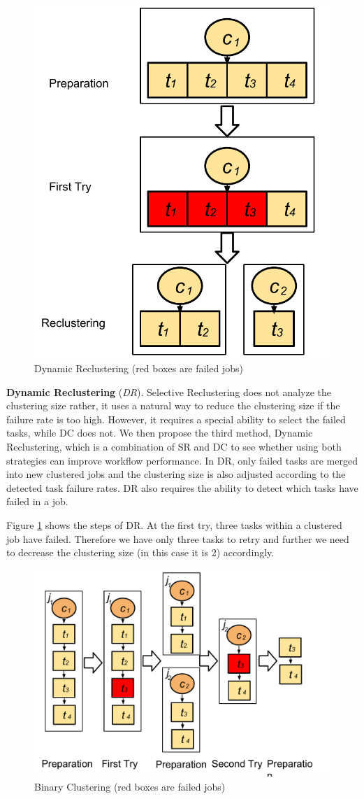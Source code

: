 \documentclass{IOS-Book-Article}
\begin{document}
\begin{figure}[!htb]
\centering
  \includegraphics[width=0.55\linewidth]{dr.pdf}
  \caption{Dynamic Reclustering (red boxes are failed jobs)}
  \label{fig:clustering_dr}
\end{figure}

\textbf{Dynamic Reclustering} (\emph{DR}). 
Selective Reclustering does not analyze the clustering size rather, it uses a natural way to reduce the clustering size if the failure rate is too high. However, it requires a special ability to select the failed tasks, while DC does not. We then propose the third method, Dynamic Reclustering, which is a combination of SR and DC to see whether using both strategies can improve workflow performance. In DR, only failed tasks are merged into new clustered jobs and the clustering size is also adjusted according to the detected task failure rates. DR also requires the ability to detect which tasks have failed in a job. 

Figure \ref{fig:clustering_dr} shows the steps of DR. At the first try, three tasks within a clustered job have failed. Therefore we have only three tasks to retry and further we need to decrease the clustering size (in this case it is 2) accordingly. 


\begin{figure}[!htb]
\centering
  \includegraphics[width=0.85\linewidth]{bc.pdf}
  \caption{Binary Clustering (red boxes are failed jobs)}
  \label{fig:clustering_bc}
\end{figure}
\end{document}
